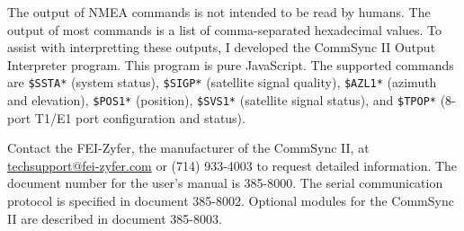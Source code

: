 \documentclass[12pt]{article}
\begin{document}
The output of NMEA commands is not intended to be read by humans.
The output of most commands is a list of comma-separated hexadecimal values.
To assist with interpretting these outputs, I developed the CommSync II Output Interpreter program. This program is pure JavaScript.
The supported commands are \texttt{\$SSTA*} (system status), \texttt{\$SIGP*} (satellite signal quality), \texttt{\$AZL1*} (azimuth and elevation), \texttt{\$POS1*} (position), \texttt{\$SVS1*} (satellite signal status), and \texttt{\$TPOP*} (8-port T1/E1 port configuration and status).

Contact the FEI-Zyfer, the manufacturer of the CommSync II, at \url{techsupport@fei-zyfer.com} or (714) 933-4003 to request detailed information.
The document number for the user's manual is 385-8000.
The serial communication protocol is specified in document 385-8002.
Optional modules for the CommSync II are described in document 385-8003.
\end{document}
